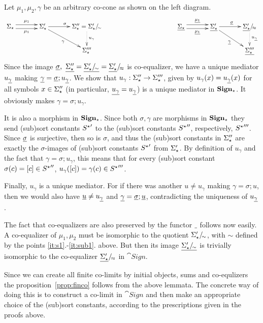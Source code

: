 \begin{PROOF}
Let $\mu_1,\mu_2,\gamma$ be an arbitrary co-cone as shown on the left diagram.
\[\xymatrix@C=1.2cm@R=0.7cm{
\Sigma_\cons \ar@<0.7ex>[r]^{\mu_1} \ar@<-0.7ex>[r]_{\mu_1} 
  & \Sigma'_\cons \ar[r]^{\sigma} \ar[dr]_\gamma
  & \Sigma''_\cons = \qu{\Sigma'_\cons}{\sim} \ar@{.>}[d]^{u_\gamma}
&&&
\under{\Sigma_\cons} \ar@<0.7ex>[r]^{\under{\mu_1}}
\ar@<-0.7ex>[r]_{\under{\mu_1}} 
  & \under{\Sigma'_\cons} \ar[r]^{\under{\sigma}} \ar[dr]_{\under{\gamma}}
  & \qu{\under{\Sigma'_\cons}}{\approx} \ar@{.>}[d]^{u_{\under\gamma}}
\\
&& \Sigma'''_\cons &&& && \under{\Sigma'''_\cons}
}
\]
Since the image $\underline{\sigma},\
\underline{\Sigma''_\star}=\underline{\Sigma'_\star/\!_{\sim}}=\underline{\Sigma'_\star}/\!_{\approx}$ is
co-equalizer, we have a unique mediator $u_{\underline{\gamma}}$ making
$\underline{\gamma}=\underline{\sigma};u_{\underline{\gamma}}$. We show that $u_\gamma:\Sigma''_\star\to\Sigma'''_\star$, given
by $u_\gamma(x)=u_{\underline{\gamma}}(x)$ for all symbols $x\in\Sigma''_\star$ (in
particular, $\underline{u_\gamma}=u_{\underline{\gamma}}$) is
a unique mediator in ${\bf Sign_\star}$. It obviously makes
$\gamma=\sigma;u_\gamma$. 

It is also a morphism in ${\bf Sign_\star}$. Since both $\sigma,\gamma$ are
morphisms in ${\bf Sign_\star}$ they send (sub)sort constants ${S^\star}'$
to the (sub)sort constants ${S^\star}''$, respectively,
${S^\star}'''$. Since $\underline{\sigma}$ is surjective, then so is $\sigma$, and
thus the (sub)sort constants in $\Sigma''_\star$ are exactly the
$\sigma$-images of (sub)sort constants ${S^\star}'$ from $\Sigma'_\star$. By
definition of $u_\gamma$ and the fact that $\gamma=\sigma;u_\gamma$, this
means that for every (sub)sort constant $\sigma(c)=[c]\in{S^\star}''$,
$u_\gamma([c])=\gamma(c)\in{S^\star}'''$. 

Finally, $u_\gamma$ is a unique mediator. For if there was another
$u\not=u_\gamma$ making $\gamma=\sigma;u$, then we would also have $\underline{u}\not=u_{\underline{\gamma}}$ and $\underline{\gamma}=\underline{\sigma};\underline{u}$,
contradicting the uniqueness of $u_{\underline{\gamma}}$.

The fact that co-equalizers are also preserved by the functor $\underline{\ }$
follows now easily. A co-equalizer of $\mu_1,\mu_2$ must be isomorphic to the
quotient $\Sigma'_\star/\!_{\sim}$, with $\sim$ defined by the points
\ref{it:s1}.-\ref{it:sub1}. above. But then its image
$\underline{\Sigma'_\star/\!_{\sim}}$ is trivially isomorphic
to the co-equalizer $\underline{\Sigma'_\star}/\!_{\approx}$ in
$\cat{Sign}$. 
\end{PROOF}
%
Since we can create all finite co-limits by initial objects, sums and
co-equlizers the proposition~\ref{prop:finco} follows from the above lemmata.
The concrete way of doing this is to construct a co-limit in $\cat{Sign}$ and
then make an appropriate choice of the (sub)sort constants,
according to the prescriptions given in the proofs above.

